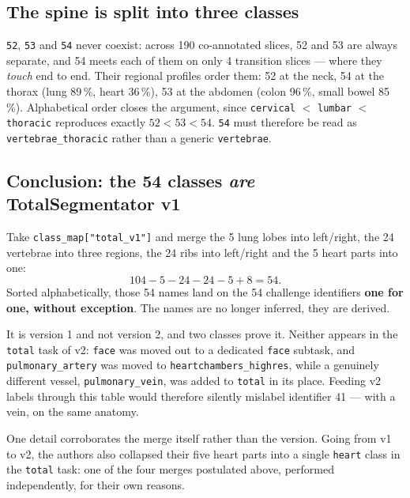 \documentclass{article}
\begin{document}
\subsection{The spine is split into three classes}

\texttt{52}, \texttt{53} and \texttt{54} never coexist: across 190 co-annotated
slices, 52 and 53 are always separate, and 54 meets each of them on only 4
transition slices --- where they \emph{touch} end to end. Their regional profiles
order them: 52 at the neck, 54 at the thorax (lung 89\,\%, heart 36\,\%), 53 at
the abdomen (colon 96\,\%, small bowel 85\,\%). Alphabetical order closes the
argument, since \texttt{cervical} $<$ \texttt{lumbar} $<$ \texttt{thoracic}
reproduces exactly $52 < 53 < 54$. \texttt{54} must therefore be read as
\texttt{vertebrae\_thoracic} rather than a generic \texttt{vertebrae}.

\subsection{Conclusion: the 54 classes \emph{are} TotalSegmentator v1}

Take \texttt{class\_map["total\_v1"]} and merge the 5 lung lobes into
left/right, the 24 vertebrae into three regions, the 24 ribs into left/right and
the 5 heart parts into one:
$$104 - 5 - 24 - 24 - 5 + 8 = 54.$$
Sorted alphabetically, those 54 names land on the 54 challenge identifiers
\textbf{one for one, without exception}. The names are no longer inferred, they
are derived.

\vspace{2.0mm}

It is version 1 and not version 2, and two classes prove it. Neither appears in
the \texttt{total} task of v2: \texttt{face} was moved out to a dedicated
\texttt{face} subtask, and \texttt{pulmonary\_artery} was moved to
\texttt{heartchambers\_highres}, while a genuinely different vessel,
\texttt{pulmonary\_vein}, was added to \texttt{total} in its place. Feeding v2
labels through this table would therefore silently mislabel identifier 41 --- with
a vein, on the same anatomy.

\vspace{2.0mm}

One detail corroborates the merge itself rather than the version. Going from v1 to
v2, the authors also collapsed their five heart parts into a single \texttt{heart}
class in the \texttt{total} task: one of the four merges postulated above,
performed independently, for their own reasons.
\end{document}
